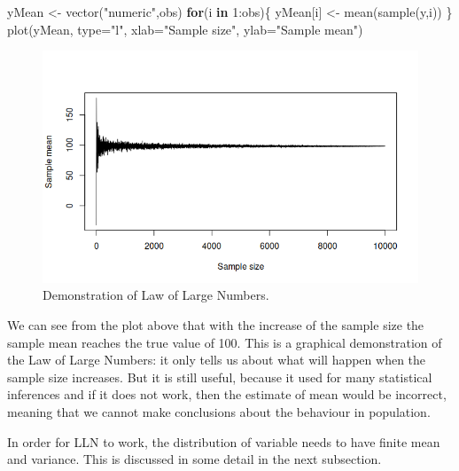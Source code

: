 \documentclass[
]{book}
\newenvironment{Shaded}{\begin{snugshade}}{\end{snugshade}}
\newcommand{\AttributeTok}[1]{\textcolor[rgb]{0.77,0.63,0.00}{#1}}
\newcommand{\ControlFlowTok}[1]{\textcolor[rgb]{0.13,0.29,0.53}{\textbf{#1}}}
\newcommand{\DecValTok}[1]{\textcolor[rgb]{0.00,0.00,0.81}{#1}}
\newcommand{\FunctionTok}[1]{\textcolor[rgb]{0.00,0.00,0.00}{#1}}
\newcommand{\NormalTok}[1]{#1}
\newcommand{\OtherTok}[1]{\textcolor[rgb]{0.56,0.35,0.01}{#1}}
\newcommand{\SpecialCharTok}[1]{\textcolor[rgb]{0.00,0.00,0.00}{#1}}
\newcommand{\StringTok}[1]{\textcolor[rgb]{0.31,0.60,0.02}{#1}}
\theoremstyle{definition}
\theoremstyle{definition}
\theoremstyle{definition}
\theoremstyle{definition}
\theoremstyle{remark}
\begin{document}
\begin{Shaded}
\begin{Highlighting}[]
\NormalTok{yMean }\OtherTok{\textless{}{-}} \FunctionTok{vector}\NormalTok{(}\StringTok{"numeric"}\NormalTok{,obs)}
\ControlFlowTok{for}\NormalTok{(i }\ControlFlowTok{in} \DecValTok{1}\SpecialCharTok{:}\NormalTok{obs)\{}
\NormalTok{    yMean[i] }\OtherTok{\textless{}{-}} \FunctionTok{mean}\NormalTok{(}\FunctionTok{sample}\NormalTok{(y,i))}
\NormalTok{\}}
\FunctionTok{plot}\NormalTok{(yMean, }\AttributeTok{type=}\StringTok{"l"}\NormalTok{, }\AttributeTok{xlab=}\StringTok{"Sample size"}\NormalTok{, }\AttributeTok{ylab=}\StringTok{"Sample mean"}\NormalTok{)}
\end{Highlighting}
\end{Shaded}

\begin{figure}
\centering
\includegraphics{images/02-statistics-LLN.png}
\caption{\label{fig:statsSampleMean}Demonstration of Law of Large Numbers.}
\end{figure}

We can see from the plot above that with the increase of the sample size the sample mean reaches the true value of 100. This is a graphical demonstration of the Law of Large Numbers: it only tells us about what will happen when the sample size increases. But it is still useful, because it used for many statistical inferences and if it does not work, then the estimate of mean would be incorrect, meaning that we cannot make conclusions about the behaviour in population.

In order for LLN to work, the distribution of variable needs to have finite mean and variance. This is discussed in some detail in the next subsection.
\end{document}
